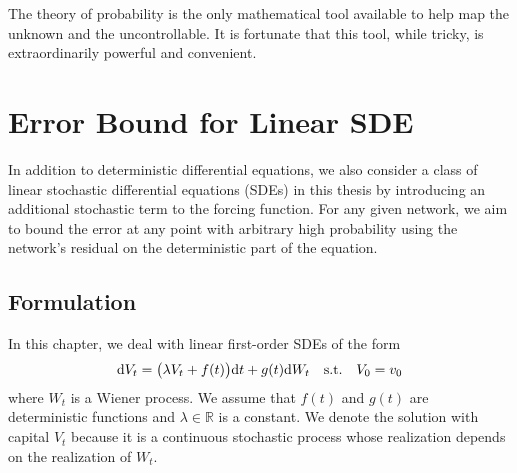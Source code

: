 \begin{savequote}[75mm]
    The theory of probability is the only mathematical tool available to help map the unknown and the uncontrollable. It is fortunate that this tool, while tricky, is extraordinarily powerful and convenient.
\end{savequote}

\chapter{Error Bound for Linear SDE}  \label{chapter:error-bound-for-linear-sdes}
    In addition to deterministic differential equations, we also consider a class of linear stochastic differential equations (SDEs) in this thesis by introducing an additional stochastic term to the forcing function. 
    For any given network, we aim to bound the error at any point with arbitrary high probability using the network's residual on the deterministic part of the equation.
\section{Formulation}
    In this chapter, we deal with linear first-order SDEs of the form
    \begin{equation}\label{eq:linear-sde}
        \mathrm{d} V_t = \big(\lambda V_t + f(t)\big)\mathrm{d} t + g(t) \mathrm{d} W_t \quad \text{s.t.} \quad V_0 = v_0 
    \end{equation}
    where $W_t$ is a Wiener process. 
    We assume that $f(t)$ and $g(t)$ are deterministic functions and $\lambda \in \mathbb{R}$ is a constant. 
    We denote the solution with capital $V_t$ because it is a continuous stochastic process whose realization depends on the realization of $W_t$.

